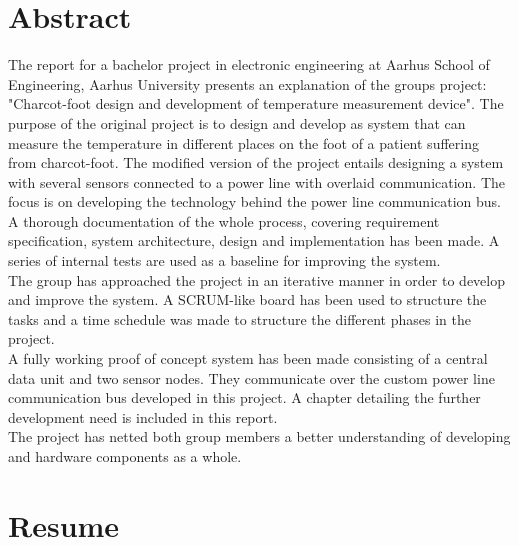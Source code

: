 \chapter{Abstract}
The report for a bachelor project in electronic engineering at Aarhus School of Engineering, Aarhus University presents an explanation of the groups project: "Charcot-foot design and development of temperature measurement device". The purpose of the original project is to design and develop as system that can measure the temperature in different places on the foot of a patient suffering from charcot-foot. The modified version of the project entails designing a system with several sensors connected to a power line with overlaid communication. The focus is on developing the technology behind the power line communication bus.\\
A thorough documentation of the whole process, covering requirement specification, system architecture, design and implementation has been made. A series of internal tests are used as a baseline for improving the system.\\
The group has approached the project in an iterative manner in order to develop and improve the system. A SCRUM-like board has been used to structure the tasks and a time schedule was made to structure the different phases in the project.\\
A fully working proof of concept system has been made consisting of a central data unit and two sensor nodes. They communicate over the custom power line communication bus developed in this project. A chapter detailing the further development need is included in this report.\\
The project has netted both group members a better understanding of developing and hardware components as a whole.\\

\chapter{Resume}
